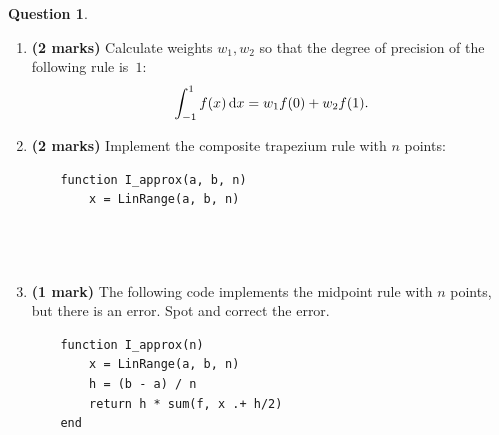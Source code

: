 \documentclass[10pt]{article}
\theoremstyle{definition}
\newtheorem{question}{Question}
\theoremstyle{remark}
\theoremstyle{plain}%
\begin{document}
\begin{question}
\begin{enumerate}
        \item
            \textbf{(2 marks)}
            Calculate weights $w_1,w_2$ so that the degree of precision of the following rule is~$1$:
            \[
                \int_{-1}^1 f(x) \, \mathrm d x = w_1 f(0) + w_2 f(1).
            \]

        \item
            \textbf{(2 marks)}
            Implement the composite trapezium rule with $n$ points:
            \begin{verbatim}
    function I_approx(a, b, n)
        x = LinRange(a, b, n)




            \end{verbatim}

        \item
            \textbf{(1 mark)}
            The following code implements the midpoint rule with $n$ points, but there is an error.
            Spot and correct the error.
            \begin{verbatim}
    function I_approx(n)
        x = LinRange(a, b, n)
        h = (b - a) / n
        return h * sum(f, x .+ h/2)
    end
            \end{verbatim}
    \end{enumerate}
\end{question}
\end{document}
